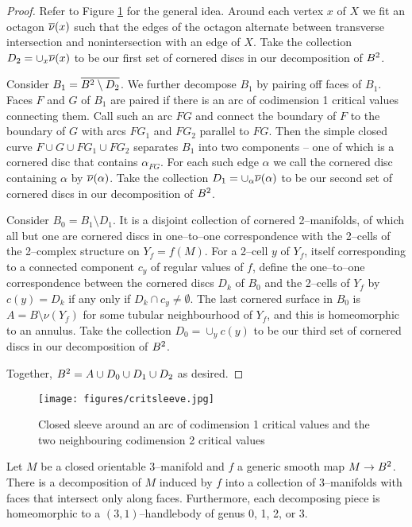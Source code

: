 \begin{proof}
	Refer to Figure \ref{fig:critsleeve} for the general idea.	
	Around each vertex $x$ of $X$ we fit an octagon $\overline{\nu}(x)$ such that the edges of the octagon alternate between transverse intersection and nonintersection with an edge of $X$.
	Take the collection $D_2=\cup_x \overline{\nu}(x)$ to be our first set of cornered discs in our decomposition of $B^2$.
	
	Consider $B_1=\overline{B^2\setminus D_2}$.
	We further decompose $B_1$ by pairing off faces of $B_1$.
	Faces $F$ and $G$ of $B_1$ are paired if there is an arc of codimension 1 critical values connecting them.
	Call such an arc $FG$ and connect the boundary of $F$ to the boundary of $G$ with arcs $FG_1$ and $FG_2$ parallel to $FG$.
	Then the simple closed curve  $F\cup G \cup FG_1\cup FG_2$ separates $B_1$ into two components -- one of which is a cornered disc that contains $\alpha_{FG}$.
	For each such edge $\alpha$ we call the cornered disc containing $\alpha$ by $\overline{\nu}(\alpha)$.
	Take the collection $D_1=\cup_\alpha \overline{\nu}(\alpha)$ to be our second set of cornered discs in our decomposition of $B^2$.
	
	Consider $B_0=B_1\setminus D_1$.
	It is a disjoint collection of cornered 2--manifolds, of which all but one are cornered discs in one--to--one correspondence with the 2--cells of the 2--complex structure on $Y_f=f(M)$.
	For a 2--cell $y$ of $Y_f$, itself corresponding to a connected component $c_y$ of regular values of $f$, define the one--to--one correspondence between the cornered discs $D_k$ of $B_0$ and the 2--cells of $Y_f$ by $c(y)=D_k$ if any only if $D_k\cap c_y\neq\emptyset$.
	The last cornered surface in $B_0$ is $A=B\setminus\nu(Y_f)$ for some tubular neighbourhood of $Y_f$, and this is homeomorphic to an annulus.
	Take the collection $D_0=\cup_y c(y)$ to be our third set of cornered discs in our decomposition of $B^2$.
	
	Together, $B^2=A\cup D_0\cup D_1\cup D_2$ as desired.
\end{proof}

\begin{figure}
	\centering
	\captionsetup{justification=centering}
	\caption{Closed sleeve around an arc of codimension 1 critical values and the two neighbouring codimension 2 critical values}
	\texttt{[image: figures/critsleeve.jpg]}
	\label{fig:critsleeve}
\end{figure}

\begin{lem}
	\label{lem:3bodydecomp}
	Let $M$ be a closed orientable 3--manifold and $f$ a generic smooth map $M\to B^2$.
	There is a decomposition of $M$ induced by $f$
	into a collection of 3--manifolds with faces that intersect only along faces.
	Furthermore, each decomposing piece is homeomorphic to a $(3,1)$--handlebody of genus 0, 1, 2, or 3.
\end{lem}


